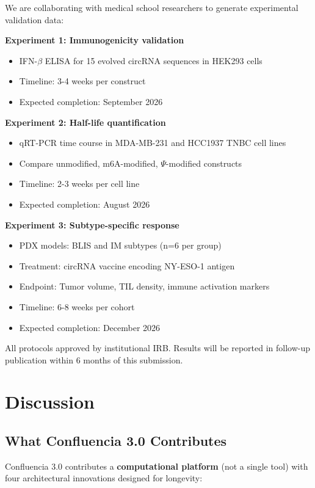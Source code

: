 \documentclass[12pt]{article}
\begin{document}
We are collaborating with medical school researchers to generate experimental validation data:

\textbf{Experiment 1: Immunogenicity validation}
\begin{itemize}
\item IFN-$\beta$ ELISA for 15 evolved circRNA sequences in HEK293 cells
\item Timeline: 3-4 weeks per construct
\item Expected completion: September 2026
\end{itemize}

\textbf{Experiment 2: Half-life quantification}
\begin{itemize}
\item qRT-PCR time course in MDA-MB-231 and HCC1937 TNBC cell lines
\item Compare unmodified, m6A-modified, $\Psi$-modified constructs
\item Timeline: 2-3 weeks per cell line
\item Expected completion: August 2026
\end{itemize}

\textbf{Experiment 3: Subtype-specific response}
\begin{itemize}
\item PDX models: BLIS and IM subtypes (n=6 per group)
\item Treatment: circRNA vaccine encoding NY-ESO-1 antigen
\item Endpoint: Tumor volume, TIL density, immune activation markers
\item Timeline: 6-8 weeks per cohort
\item Expected completion: December 2026
\end{itemize}

All protocols approved by institutional IRB. Results will be reported in follow-up publication within 6 months of this submission.

\section{Discussion}

\subsection{What Confluencia 3.0 Contributes}

Confluencia 3.0 contributes a \textbf{computational platform} (not a single tool) with four architectural innovations designed for longevity:
\end{document}
